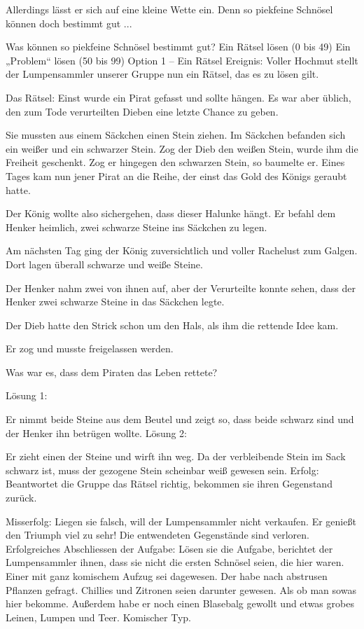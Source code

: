 Allerdings lässt er sich auf eine kleine Wette ein. Denn so piekfeine Schnösel können doch bestimmt gut ...

Was können so piekfeine Schnösel bestimmt gut?
Ein Rätsel lösen (0 bis 49)
Ein „Problem“ lösen (50 bis 99)
Option 1 – Ein Rätsel
Ereignis: Voller Hochmut stellt der Lumpensammler unserer Gruppe nun ein Rätsel, das es zu lösen gilt.


Das Rätsel:
Einst wurde ein Pirat gefasst und sollte hängen. Es war aber üblich, den zum Tode verurteilten Dieben eine letzte Chance zu geben.

Sie mussten aus einem Säckchen einen Stein ziehen. Im Säckchen befanden sich ein weißer und ein schwarzer Stein. Zog der Dieb den weißen Stein, wurde ihm die Freiheit geschenkt. Zog er hingegen den schwarzen Stein, so baumelte er. Eines Tages kam nun jener Pirat an die Reihe, der einst das Gold des Königs geraubt hatte.

Der König wollte also sichergehen, dass dieser Halunke hängt. Er befahl dem Henker heimlich, zwei schwarze Steine ins Säckchen zu legen.

Am nächsten Tag ging der König zuversichtlich und voller Rachelust zum Galgen. Dort lagen überall schwarze und weiße Steine.

Der Henker nahm zwei von ihnen auf, aber der Verurteilte konnte sehen, dass der Henker zwei schwarze Steine in das Säckchen legte.

Der Dieb hatte den Strick schon um den Hals, als ihm die rettende Idee kam.

Er zog und musste freigelassen werden.

Was war es, dass dem Piraten das Leben rettete?


Lösung 1:

Er nimmt beide Steine aus dem Beutel und zeigt so, dass beide schwarz sind und der Henker ihn betrügen wollte.
Lösung 2:

Er zieht einen der Steine und wirft ihn weg. Da der verbleibende Stein im Sack schwarz ist, muss der gezogene Stein scheinbar weiß gewesen sein.
Erfolg: Beantwortet die Gruppe das Rätsel richtig, bekommen sie ihren Gegenstand zurück.

Misserfolg: Liegen sie falsch, will der Lumpensammler nicht verkaufen. Er genießt den Triumph viel zu sehr! Die entwendeten Gegenstände sind verloren.
Erfolgreiches Abschliessen der Aufgabe: Lösen sie die Aufgabe, berichtet der Lumpensammler ihnen, dass sie nicht die ersten Schnösel seien, die hier waren. Einer mit ganz komischem Aufzug sei dagewesen. Der habe nach abstrusen Pflanzen gefragt. Chillies und Zitronen seien darunter gewesen. Als ob man sowas hier bekomme. Außerdem habe er noch einen Blasebalg gewollt und etwas grobes Leinen, Lumpen und Teer. Komischer Typ.


